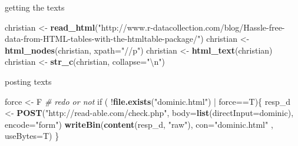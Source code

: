 \documentclass[ignorenonframetext,]{beamer}
\newenvironment{Shaded}{\begin{snugshade}}{\end{snugshade}}
\newcommand{\KeywordTok}[1]{\textcolor[rgb]{0.13,0.29,0.53}{\textbf{{#1}}}}
\newcommand{\DataTypeTok}[1]{\textcolor[rgb]{0.13,0.29,0.53}{{#1}}}
\newcommand{\CharTok}[1]{\textcolor[rgb]{0.31,0.60,0.02}{{#1}}}
\newcommand{\StringTok}[1]{\textcolor[rgb]{0.31,0.60,0.02}{{#1}}}
\newcommand{\CommentTok}[1]{\textcolor[rgb]{0.56,0.35,0.01}{\textit{{#1}}}}
\newcommand{\NormalTok}[1]{{#1}}
\begin{document}
\begin{frame}[fragile]{getting the texts}

\begin{Shaded}
\begin{Highlighting}[]
\NormalTok{christian <-}\StringTok{ }\KeywordTok{read_html}\NormalTok{(}\StringTok{"http://www.r-datacollection.com/blog/Hassle-free-data-from-HTML-tables-with-the-htmltable-package/"}\NormalTok{)}
\NormalTok{christian <-}\StringTok{ }\KeywordTok{html_nodes}\NormalTok{(christian, }\DataTypeTok{xpath=}\StringTok{"//p"}\NormalTok{)}
\NormalTok{christian <-}\StringTok{ }\KeywordTok{html_text}\NormalTok{(christian)}
\NormalTok{christian <-}\StringTok{ }\KeywordTok{str_c}\NormalTok{(christian, }\DataTypeTok{collapse=}\StringTok{"}\CharTok{\textbackslash{}n}\StringTok{"}\NormalTok{)}
\end{Highlighting}
\end{Shaded}

\end{frame}

\begin{frame}[fragile]{posting texts}

\begin{Shaded}
\begin{Highlighting}[]
\NormalTok{force <-}\StringTok{ }\NormalTok{F }\CommentTok{# redo or not}
\NormalTok{if ( !}\KeywordTok{file.exists}\NormalTok{(}\StringTok{"dominic.html"}\NormalTok{) |}\StringTok{ }\NormalTok{force==T)\{}
  \NormalTok{resp_d <-}\StringTok{ }\KeywordTok{POST}\NormalTok{(}\StringTok{"http://read-able.com/check.php"}\NormalTok{,}
            \DataTypeTok{body=}\KeywordTok{list}\NormalTok{(}\DataTypeTok{directInput=}\NormalTok{dominic), }
            \DataTypeTok{encode=}\StringTok{"form"}\NormalTok{)}
  \KeywordTok{writeBin}\NormalTok{(}\KeywordTok{content}\NormalTok{(resp_d, }\StringTok{"raw"}\NormalTok{), }
           \DataTypeTok{con=}\StringTok{"dominic.html"} \NormalTok{, }\DataTypeTok{useBytes=}\NormalTok{T)}
\NormalTok{\}}
\end{Highlighting}
\end{Shaded}

\end{frame}
\end{document}
